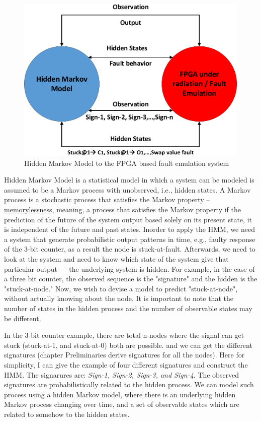 \begin{figure}[tb!]

 \centering
  \captionsetup{justification=centering}    
   \includegraphics[scale=0.8]{Figures/HMM-air.pdf}
   \caption{Hidden Markov Model to the FPGA based fault emulation system}
\label{fig:HMM-air}
\end{figure}






Hidden Markov Model is a statistical model in which a system can be modeled is assumed to be a Markov process with unobserved, i.e., hidden states. A Markov process  is a stochastic process that satisfies the Markov property -- \underline{memorylessness}, meaning, a process that satisfies the Markov property if the prediction of the future of the system output based solely on its present state, it is independent of the future and past states. Inorder to apply the HMM, we need a system that generate probabilistic output patterns in time, e.g., faulty response of the 3-bit counter, as a result the node is stuck-at-fault. Afterwards, we need to look at the system and need to know which state of the system give that particular output ---  the underlying system is hidden. For example, in the case of a three bit counter, the observed sequence is the "signature" and the hidden is the "stuck-at-node." Now, we wish to devise a model to predict "stuck-at-node", without actually knowing about the node. It is important to note that the number of states in the hidden process and the number of observable states may be different. 


In the 3-bit counter example, there are total n-nodes where the signal can get stuck (stuck-at-1, and stuck-at-0) both are possible. and we can get the  different signatures (chapter Preliminaries derive signatures for all the nodes). Here for simplicity, I can give the example of four different signatures and construct the HMM. The signarures are: \textit{Sign-1, Sign-2, Sign-3, and Sign-4}. The observed signatures are probabilistically related to the hidden process. We can model such process using a hidden Markov model, where there is an underlying hidden Markov process changing over time, and a set of observable states which are related to somehow to the hidden states.


